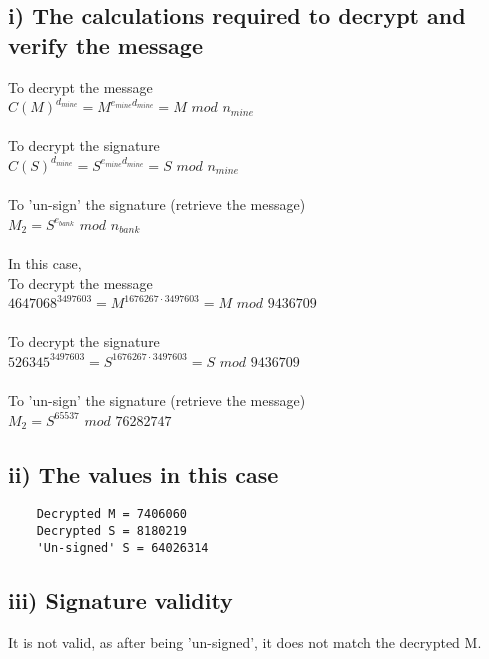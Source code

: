 \documentclass[a4paper,12pt]{article}
\begin{document}
\subsection*{i) The calculations required to decrypt and verify the message}
To decrypt the message\\
$C(M)^{d_{mine}} = M^{e_{mine}d_{mine}} = M$ $mod$ $n_{mine}$\\\\
To decrypt the signature\\
$C(S)^{d_{mine}} = S^{e_{mine}d_{mine}} = S$ $mod$ $n_{mine}$\\\\
To 'un-sign' the signature (retrieve the message)\\
$M_2 = S^{e_{bank}}$ $mod$ $n_{bank}$\\\\
\newpage \noindent In this case,\\
To decrypt the message\\
$4647068^{3497603} = M^{1676267\cdot 3497603} = M$ $mod$ $9436709$\\\\
To decrypt the signature\\
$526345^{3497603} = S^{1676267\cdot 3497603} = S$ $mod$ $9436709$\\\\
To 'un-sign' the signature (retrieve the message)\\
$M_2 = S^{65537}$ $mod$ $76282747$

\subsection*{ii) The values in this case}
\begin{verbatim}
    Decrypted M = 7406060
    Decrypted S = 8180219
    'Un-signed' S = 64026314
\end{verbatim}

\subsection*{iii) Signature validity}
It is not valid, as after being 'un-signed', it does not match the decrypted M.
\end{document}
